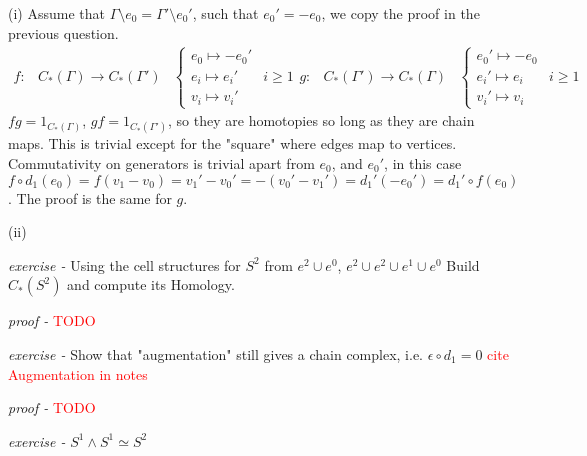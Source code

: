 \documentclass[11pt]{article}
\theoremstyle{definition}
\begin{document}
    (i) Assume that \(\Gamma\setminus e_0 = \Gamma' \setminus e_0'\), such that \(e_0' = -e_0\), we copy the proof in the previous question.
    \begin{align*}
        f: &C_*(\Gamma) \to C_*(\Gamma')
        &\begin{cases}
            e_0 \mapsto -e_0' \\
            e_i \mapsto e_i' & i \geq 1 \\
            v_i \mapsto v_i'
        \end{cases}
        g: &C_*(\Gamma') \to C_*(\Gamma)
        &\begin{cases}
            e_0' \mapsto -e_0 \\
            e_i' \mapsto e_i & i \geq 1 \\
            v_i' \mapsto v_i
        \end{cases}
    \end{align*}
    \(fg = 1_{C_*(\Gamma)}\), \(gf = 1_{C_*(\Gamma')}\), so they are homotopies so long as they are chain maps. This is trivial except for the "square" where edges map to vertices.
    Commutativity on generators is trivial apart from \(e_0\), and \(e_0'\), in this case \(f\circ d_1(e_0) = f(v_1 - v_0) = v_1' - v_0' = -(v_0' - v_1') = d_1'(-e_0') = d_1'\circ f (e_0)\). The proof is the same for \(g\).

    (ii) 



    \emph{exercise - }\label{HEx5} Using the cell structures for \(S^2\) from \(e^2 \cup e^0\), \(e^2 \cup e^2 \cup e^1 \cup e^0\) Build \(C_*(S^2)\) and compute its Homology.

    \emph{proof - } \textcolor{red}{TODO}


    \emph{exercise - }\label{HEx6} Show that "augmentation" still gives a chain complex, i.e. \(\epsilon\circ d_1 = 0\) \textcolor{red}{cite Augmentation in notes}

    \emph{proof - }\textcolor{red}{TODO}


    \emph{exercise - }\label{HEx7} \(S^1 \wedge S^1 \simeq S^2\)
\end{document}
